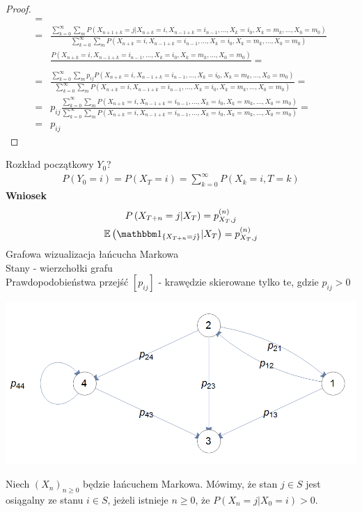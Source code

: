 \begin{twr}
\begin{proof}
\begin{align*}
=\\=&
\frac{\sum_{k=0}^{\infty }\sum_mP\left(X_{n+1+k}=j|X_{n+k}=i,X_{n-1+k}=i_{n-1},\dots,X_k=i_0,X_k=m_k,\dots,X_0=m_0\right)}
{\sum_{k=0}^{\infty }\sum_mP\left(X_{n+k}=i,X_{n-1+k}=i_{n-1},\dots,X_k=i_0,X_k=m_k,\dots,X_0=m_0\right)}\\&
\frac{P\left(X_{n+k}=i,X_{n-1+k}=i_{n-1},\dots,X_k=i_0,X_k=m_k,\dots,X_0=m_0\right)}{}
=\\=&
\frac{\sum_{k=0}^{\infty }\sum_mp_{ij}P\left(X_{n+k}=i,X_{n-1+k}=i_{n-1},\dots,X_k=i_0,X_k=m_k,\dots,X_0=m_0\right)}
{\sum_{k=0}^{\infty }\sum_mP\left(X_{n+k}=i,X_{n-1+k}=i_{n-1},\dots,X_k=i_0,X_k=m_k,\dots,X_0=m_0\right)}
=\\=&
p_{ij}\frac{\sum_{k=0}^{\infty }\sum_mP\left(X_{n+k}=i,X_{n-1+k}=i_{n-1},\dots,X_k=i_0,X_k=m_k,\dots,X_0=m_0\right)}
{\sum_{k=0}^{\infty }\sum_mP\left(X_{n+k}=i,X_{n-1+k}=i_{n-1},\dots,X_k=i_0,X_k=m_k,\dots,X_0=m_0\right)}
=\\=&
p_{ij}
\end{align*}
\end{proof}
\end{twr}
Rozkład początkowy $ Y_0 $?
\begin{gather*}
P\left(Y_0=i\right)=P\left(X_T=i\right)=\sum_{k=0}^{\infty }P\left(X_k=i,T=k\right)
\end{gather*}
\textbf{Wniosek}\\
\begin{gather*}
P\left(X_{T+n}=j|X_T\right)=p_{X_T,j}^{(n)}\\
\mathbb E \left(\mathbbm1_{\left\{X_{T+n}=j\right\}}|X_T\right)=p_{X_T,j}^{(n)}
\end{gather*}
Grafowa wizualizacja łańcucha Markowa\\
Stany - wierzchołki grafu\\
Prawdopodobieństwa przejść $ [p_{ij}] $ - krawędzie skierowane tylko te, gdzie $ p_{ij}>0 $
\begin{center}
\includegraphics[width=0.7\linewidth]{graf}
\end{center}
\begin{defi}
Niech $ \left(X_n\right)_{n\ge0} $ będzie łańcuchem Markowa. Mówimy, że stan $ j\in S $ jest osiągalny ze stanu $ i\in S $, jeżeli istnieje $ n\ge0 $, że $ P\left(X_n=j|X_0=i\right)>0 $.
\end{defi}
